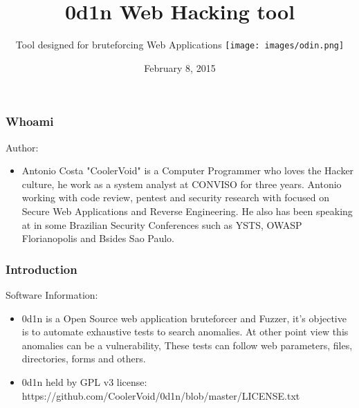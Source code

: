 \documentclass[serif,mathserif]{beamer}
\author[0d1n web hacking tool]{ Tool designed for bruteforcing Web Applications \quad \texttt{[image: images/odin.png]} }
\title[ Page \hspace{2em}\insertframenumber/\inserttotalframenumber]{0d1n Web Hacking tool}
\date{February 8, 2015}
\institute{Antonio Costa - CoolerVoid - coolerlair[aT]gmail[DOt]com}
\begin{document}
\maketitle




\begin{frame}
  \frametitle{Whoami}
  Author:
  \begin{itemize}  \item  Antonio Costa "CoolerVoid" is a Computer Programmer who loves the Hacker culture, he work as a system analyst at CONVISO for three years. Antonio working with code review, pentest and security research with focused on Secure Web Applications and Reverse Engineering.  He also has been speaking at in some Brazilian Security Conferences such as YSTS, OWASP Florianopolis and Bsides Sao Paulo.
  \end{itemize}
  \begin{figure}[t]
    \centering
    \subfigure[]{
    \texttt{[image: images/tony.png]}}
  \end{figure}
\end{frame}


\begin{frame}
  \frametitle{Introduction}
  Software Information:
  \begin{itemize}
  \item  0d1n is a Open Source web application bruteforcer and Fuzzer,  it’s objective is to automate exhaustive tests to search anomalies. At other point view this anomalies can be a vulnerability, These tests can  follow web parameters, files, directories, forms and others. 
  \item  0d1n held by GPL v3 license: https://github.com/CoolerVoid/0d1n/blob/master/LICENSE.txt
  \end{itemize}
\end{frame}
\end{document}
